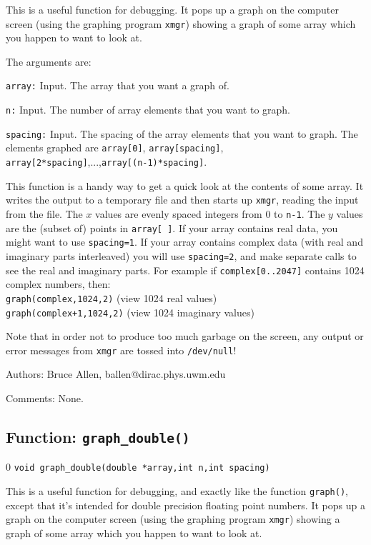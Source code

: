 This is a useful function for debugging.  It pops up a graph on the
computer screen (using the graphing program {\tt xmgr}) showing a graph
of some array which you happen to want to look at.
 
The arguments are:
\begin{description}
\item{\tt array:} Input.  The array that you want a graph of.
\item{\tt n:} Input.  The number of array elements that you want to graph.
\item{\tt spacing:} Input.  The spacing of the array elements that you want
   to graph.  The elements graphed are {\tt array[0]}, {\tt array[spacing]},
   {\tt array[2*spacing]},...,{\tt array[(n-1)*spacing]}.
\end{description}

This function is a handy way to get a quick look at the contents of some
array.  It writes the output to a temporary file and then starts up
{\tt xmgr}, reading the input from the file.  The $x$ values are evenly
spaced integers from $0$ to {\tt n-1}.  The $y$ values are the (subset of)
points in {\tt array[ ]}.  If your array contains real data, you might want
to use {\tt spacing=1}.  If your array contains complex data (with real
and imaginary parts interleaved) you will use {\tt spacing=2},
and make separate calls to see the real and imaginary parts. For
example if {\tt complex[0..2047]} contains 1024 complex numbers, then:\\
{\tt graph(complex,1024,2)} (view 1024 real values)\\
{\tt graph(complex+1,1024,2)} (view 1024 imaginary values)

Note that in order not to produce too much garbage on the screen,
any output or error messages from {\tt xmgr} are tossed into 
{\tt /dev/null}!
\begin{description}
\item{Authors:}
Bruce Allen, ballen@dirac.phys.uwm.edu
\item{Comments:}
None.
\end{description}
\clearpage

\subsection{Function: {\tt graph\_double()}}
\setcounter{equation}0
{\tt void graph\_double(double *array,int n,int spacing)}

This is a useful function for debugging, and exactly like the function
{\tt graph()}, except that it's intended for double precision floating
point numbers.  It pops up a graph on the computer screen (using the
graphing program {\tt xmgr}) showing a graph of some array which you
happen to want to look at.

